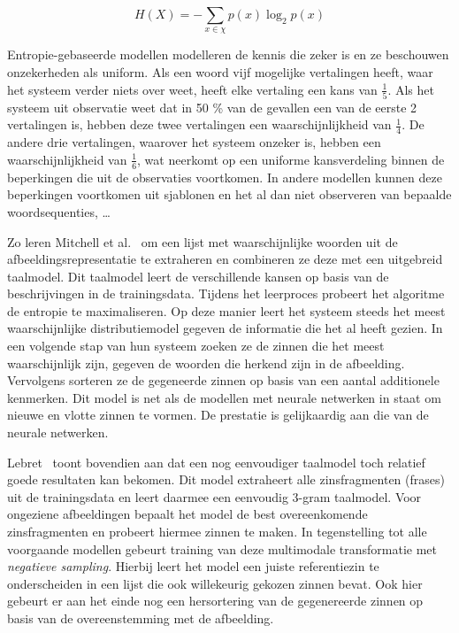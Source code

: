 \begin{equation}
     H(X) = -\sum_{x \in \chi}p(x)\log_2p(x)
     \label{entropy}
 \end{equation} 

Entropie-gebaseerde modellen modelleren de kennis die zeker is en ze beschouwen onzekerheden als uniform. Als een woord vijf mogelijke vertalingen heeft, waar het systeem verder niets over weet, heeft elke vertaling een kans van $\frac{1}{5}$. Als het systeem uit observatie weet dat in 50 \% van de gevallen een van de eerste 2 vertalingen is, hebben deze twee vertalingen een waarschijnlijkheid van $\frac{1}{4}$. De andere drie vertalingen, waarover het systeem onzeker is, hebben een waarschijnlijkheid van $\frac{1}{6}$, wat neerkomt op een uniforme kansverdeling binnen de beperkingen die uit de observaties voortkomen. In andere modellen kunnen deze beperkingen voortkomen uit sjablonen en het al dan niet observeren van bepaalde woordsequenties, \ldots~\cite{Berger1996}

Zo leren Mitchell et al.~\cite{Mitchell2015} om een lijst met waarschijnlijke woorden uit de afbeeldingsrepresentatie te extraheren en combineren ze deze met een uitgebreid taalmodel. Dit taalmodel leert de verschillende kansen op basis van de beschrijvingen in de trainingsdata. Tijdens het leerproces probeert het algoritme de entropie te maximaliseren. Op deze manier leert het systeem steeds het meest waarschijnlijke distributiemodel gegeven de informatie die het al heeft gezien. In een volgende stap van hun systeem zoeken ze de zinnen die het meest waarschijnlijk zijn, gegeven de woorden die herkend zijn in de afbeelding. Vervolgens sorteren ze de gegeneerde zinnen op basis van een aantal additionele kenmerken. Dit model is net als de modellen met neurale netwerken in staat om nieuwe en vlotte zinnen te vormen. De prestatie is gelijkaardig aan die van de neurale netwerken.

Lebret~\cite{Lebret2015} toont bovendien aan dat een nog eenvoudiger taalmodel toch relatief goede resultaten kan bekomen. Dit model extraheert alle zinsfragmenten (frases) uit de trainingsdata en leert daarmee een eenvoudig 3-gram taalmodel. Voor ongeziene afbeeldingen bepaalt het model de best overeenkomende zinsfragmenten en probeert hiermee zinnen te maken. In tegenstelling tot alle voorgaande modellen gebeurt training van deze multimodale transformatie met \emph{negatieve sampling}. Hierbij leert het model een juiste referentiezin te onderscheiden in een lijst die ook willekeurig gekozen zinnen bevat. Ook hier gebeurt er aan het einde nog een hersortering van de gegenereerde zinnen op basis van de overeenstemming met de afbeelding.


